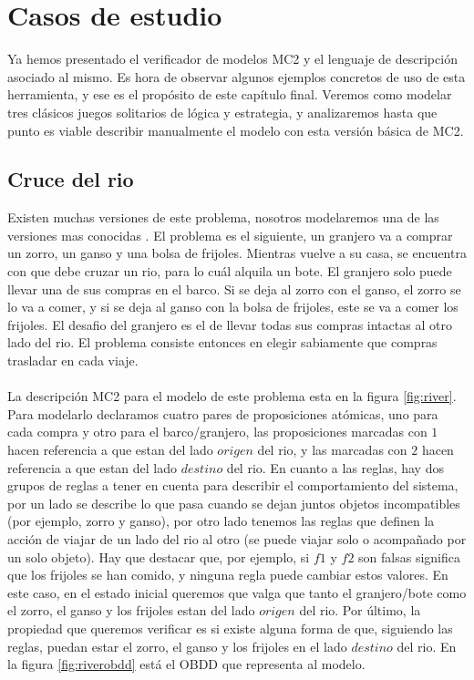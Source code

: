 \chapter{Casos de estudio}

Ya hemos presentado el verificador de modelos MC2 y el lenguaje de descripción asociado al mismo. Es hora de observar algunos ejemplos concretos de uso de esta herramienta, y ese es el propósito de este capítulo final. Veremos como modelar tres clásicos juegos solitarios de lógica y estrategia, y analizaremos hasta que punto es viable describir manualmente el modelo con esta versión básica de MC2.

\section{Cruce del rio}

Existen muchas versiones de este problema, nosotros modelaremos una de las versiones mas conocidas \cite{Hadley:12}. El problema es el siguiente, un granjero va a comprar un zorro, un ganso y una bolsa de frijoles. Mientras vuelve a su casa, se encuentra con que debe cruzar un rio, para lo cuál alquila un bote. El granjero solo puede llevar una de sus compras en el barco. Si se deja al zorro con el ganso, el zorro se lo va a comer, y si se deja al ganso con la bolsa de frijoles, este se va a comer los frijoles. El desafio del granjero es el de llevar todas sus compras intactas al otro lado del rio. El problema consiste entonces en elegir sabiamente que compras trasladar en cada viaje.\\
\\
La descripción MC2 para el modelo de este problema esta en la figura \ref{fig:river}. Para modelarlo declaramos cuatro pares de proposiciones atómicas, uno para cada compra y otro para el barco/granjero, las proposiciones marcadas con $1$ hacen referencia a que estan del lado $origen$ del rio, y las marcadas con $2$ hacen referencia a que estan del lado $destino$ del rio. En cuanto a las reglas, hay dos grupos de reglas a tener en cuenta para describir el comportamiento del sistema, por un lado se describe lo que pasa cuando se dejan juntos objetos incompatibles (por ejemplo, zorro y ganso), por otro lado tenemos las reglas que definen la acción de viajar de un lado del rio al otro (se puede viajar solo o acompañado por un solo objeto). Hay que destacar que, por ejemplo, si $f1$ y $f2$ son falsas significa que los frijoles se han comido, y ninguna regla puede cambiar estos valores. En este caso, en el estado inicial queremos que valga que tanto el granjero/bote como el zorro, el ganso y los frijoles estan del lado $origen$ del rio. Por último, la propiedad que queremos verificar es si existe alguna forma de que, siguiendo las reglas, puedan estar el zorro, el ganso y los frijoles en el lado $destino$ del rio. En la figura \ref{fig:riverobdd} está el OBDD que representa al modelo.

